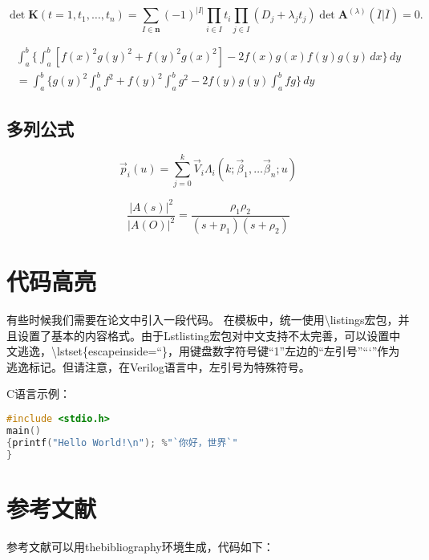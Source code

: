 \newcommand{\envert}[1]{\left\lvert#1\right\rvert} 
\begin{equation}\label{detK2}
\det\mathbf{K}(t=1,t_1,\dots,t_n)=\sum_{I\in\mathbf{n}}(-1)^{\envert{I}}
\prod_{i\in I}t_i\prod_{j\in I}(D_j+\lambda_jt_j)\det\mathbf{A}
^{(\lambda)}(\overline{I}|\overline{I})=0.
\end{equation} 

\begin{multline}%
\int_a^b\biggl\{\int_a^b[f(x)^2g(y)^2+f(y)^2g(x)^2]
 -2f(x)g(x)f(y)g(y)\,dx\biggr\}\,dy \\
 =\int_a^b\biggl\{g(y)^2\int_a^bf^2+f(y)^2
  \int_a^b g^2-2f(y)g(y)\int_a^b fg\biggr\}\,dy
\end{multline}

\subsection{多列公式}

\begin{equation} 
\overrightarrow {p}_{i}\left( u\right) =\sum _{j=0}^{k}\overrightarrow {V}_{i}\Lambda _{i}\left( k;\overrightarrow {\beta }_{1},\ldots \overrightarrow {\beta }_{n};u\right)
\end{equation}

\begin{equation} 
\dfrac {\left| A\left( s\right) \right| ^{2}} {\left| A\left( O\right) \right| ^{2}}=\dfrac {\rho _{1}\rho _{2}} {\left( s+p_{1}\right) \left( s+\rho _{2}\right) }
\end{equation}

\section{代码高亮}
有些时候我们需要在论文中引入一段代码。
在模板中，统一使用\textbackslash listings宏包，并且设置了基本的内容格式。由于Lstlisting宏包对中文支持不太完善，可以设置中文逃逸，\textbackslash lstset\{escapeinside=``\}，用键盘数字符号键“1”左边的“左引号”“`”作为逃逸标记。但请注意，在Verilog语言中，左引号为特殊符号。

C语言示例：

\begin{lstlisting}[language=C]
#include <stdio.h>
main()
{printf("Hello World!\n"); %"`你好，世界`"
}
\end{lstlisting}

\section{参考文献}
参考文献可以用thebibliography环境生成，代码如下：

